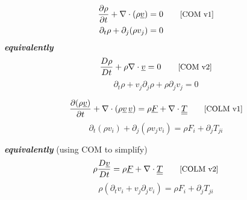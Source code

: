\documentclass[12pt,landscape]{article}
\begin{document}
\thispagestyle{fancy}

\Large

\noindent
\begin{minipage}[t]{0.45\textwidth}
\section*{\centering{}}
\begin{align}
    \frac{\partial \rho}{\partial t} + \nabla\cdot(\rho \underline{v}) &= 0 \tag*{\text{\small[COM v1]}}\\
    \partial_t\rho + \partial_j (\rho v_j) &= 0 \nonumber
\end{align}
\textbf{\emph{equivalently}}
\begin{equation}
    \frac{D \rho}{D t} + \rho\nabla\cdot\underline{v} = 0
    \tag*{\text{\small[COM v2]}}
\end{equation}
\begin{equation*}
    \partial_t\rho + v_j\partial_j \rho + \rho \partial_j v_j = 0
\end{equation*}
\noindent\makebox[\linewidth]{\rule{\textwidth}{1pt}}

\vspace{-3mm}

\begin{equation}
    \frac{\partial (\rho \underline{v})}{\partial t} + \nabla\cdot(\rho \underline{v} \, \underline{v}) = \rho\underline{F} + \nabla\cdot\underline{\underline{T}}
    \tag*{\text{\small[COLM v1]}}
\end{equation}
\begin{equation*}
    \partial_t (\rho v_i) + \partial_j(\rho v_j v_i) = \rho F_i + \partial_j T_{ji}
\end{equation*}

\textbf{\emph{equivalently}} (using COM to simplify)
\begin{equation}
    \rho\frac{D \underline{v}}{D t} = \rho\underline{F} + \nabla\cdot\underline{\underline{T}} \tag*{\text{\small[COLM v2]}}
\end{equation}
\begin{equation*}
    \rho \left(\partial_t v_i + v_j\partial_j v_i\right) = \rho F_i + \partial_j T_{ji}
\end{equation*}

\noindent\makebox[\linewidth]{\rule{\textwidth}{1pt}}

\end{minipage}
\end{document}
